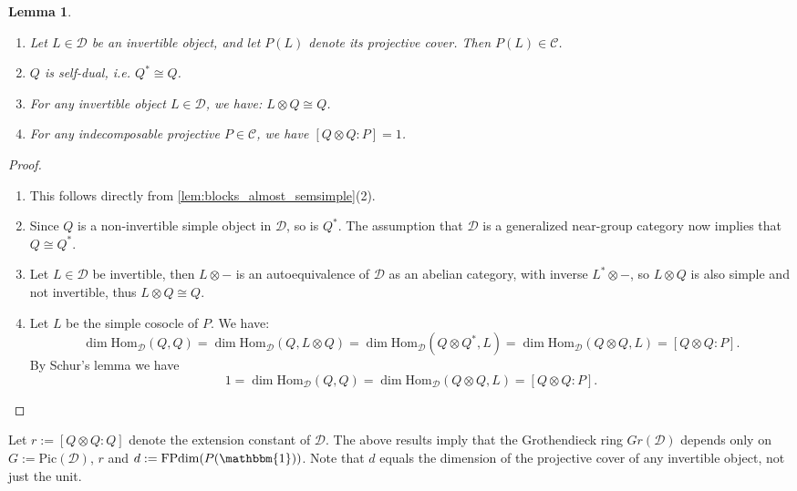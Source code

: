 \documentclass{amsart}
\theoremstyle{plain}%
\newtheorem{lemma}{Lemma}[subsection]
\theoremstyle{remark}
\newcommand{\C}{\mathcal{C}}
\newcommand{\1}{\mathbbm{1}}
\newcommand{\D}{\mathcal{D}}
\newcommand{\FPdim}{\mathrm{FPdim}}
\newcommand{\Hom}{\mathrm{Hom}}
\newcommand{\pic}{\mathrm{Pic}}
\newcommand{\comment}[1]{}
\begin{document}
    \begin{lemma}\label{lemma: tensor product of simple projective object}
        \mbox{}
        \begin{enumerate}
            \item Let $L \in \D$ be an invertible object, and let $P(L)$ denote its projective cover. Then $P(L)\in \C$. 
            \item $Q$ is self-dual, i.e. $Q^*\cong Q$.
            \item For any invertible object $L\in \D$, we have: $L\otimes Q\cong Q$.
            \item For any indecomposable projective $P\in \C$, we have $[Q\otimes Q:P] = 1$.
        \end{enumerate}
    \end{lemma}
    \begin{proof}
        \mbox{}
        \begin{enumerate}
            \item This follows directly from \cref{lem:blocks_almost_semsimple}(2).
            \item Since $Q$ is a non-invertible simple object in $\D$, so is $Q^*$. The assumption that $\D$ is a generalized near-group category now implies that $Q\cong Q^*$.
            \item Let $L\in \D$ be invertible, then $L\otimes -$ is an autoequivalence of $\D$ as an abelian category, with inverse $L^*\otimes-$, so $L\otimes Q$ is also simple and not invertible, thus $L\otimes Q\cong Q$.
            \item Let $L$ be the simple cosocle of $P$. We have:
            $$\dim\Hom_{\D}(Q,Q) =\dim\Hom_{\D}(Q,L\otimes Q) = \dim\Hom_{\D}(Q\otimes Q^*,L) = \dim\Hom_{\D}(Q\otimes Q ,L) = [Q\otimes Q:P].$$
            By Schur's lemma we have $$1=\dim \Hom_{\D}(Q,Q)=\dim \Hom_{\D}(Q\otimes Q ,L) =[Q\otimes Q:P].$$
        \end{enumerate}
    \end{proof}
    \comment{
    \begin{lemma}\label{cor:decomp_D_as_C_bimod}
        We have a decomposition of $\C$-bimodule categories $\D=\C\oplus \langle Q\rangle_{\oplus}$, where $\langle Q\rangle_{\oplus}$ is the full additive subcategory of $\D$ generated by $Q$.
    \end{lemma}
    }
    Let $r:=[Q\otimes Q:Q]$ denote the extension constant of $\D$. The above results imply that the Grothendieck ring $Gr(\D)$ depends only on $G:=\pic(\D)$, $r$ and $d:=\FPdim(P(\1))$. Note that $d$ equals the dimension of the projective cover of any invertible object, not just the unit.
\end{document}
